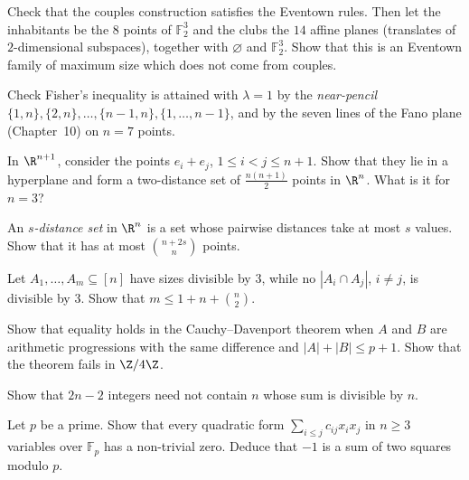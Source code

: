 \begin{exercise}[$\star$]\label{ex:eventown}
Check that the couples construction satisfies the Eventown rules. Then let the inhabitants be the $8$ points of $\mathbb F_2^3$ and the clubs the $14$ affine planes (translates of $2$-dimensional subspaces),
together with $\varnothing$ and $\mathbb F_2^3$. Show that this is an Eventown family of maximum size which does not come from couples.
\end{exercise}

\begin{exercise}[$\star$]\label{ex:nearpencil}
Check Fisher's inequality is attained with $\lambda=1$ by the \emph{near-pencil} $\{1,n\},\{2,n\},\dots,\{n-1,n\},\{1,\dots,n-1\}$, and by the seven lines of the Fano plane (Chapter~10) on $n=7$ points.
\end{exercise}

\begin{exercise}[$\star$]\label{ex:simplexdist}
In $\R^{n+1}$, consider the points $e_i+e_j$, $1\le i<j\le n+1$. Show that they lie in a hyperplane and form a two-distance set of $\frac{n(n+1)}2$ points in $\R^n$. What is it for $n=3$?
\end{exercise}

\begin{exercise}[$\star\star$]\label{ex:sdistance}
An \emph{$s$-distance set} in $\R^n$ is a set whose pairwise distances take at most $s$ values. Show that it has at most $\binom{n+2s}{n}$ points.
\end{exercise}

\begin{exercise}[$\star$]\label{ex:fwmodthree}
Let $A_1,\dots,A_m\subseteq[n]$ have sizes divisible by $3$, while no $|A_i\cap A_j|$, $i\ne j$, is divisible by $3$. Show that $m\le1+n+\binom n2$.
\end{exercise}

\begin{exercise}[$\star$]\label{ex:cdsharp}
Show that equality holds in the Cauchy--Davenport theorem when $A$ and $B$ are arithmetic progressions with the same difference and $|A|+|B|\le p+1$. Show that the theorem fails in $\Z/4\Z$.
\end{exercise}

\begin{exercise}[$\star$]\label{ex:egzsharp}
Show that $2n-2$ integers need not contain $n$ whose sum is divisible by $n$.
\end{exercise}

\begin{exercise}[$\star\star$]\label{ex:quadric}
Let $p$ be a prime. Show that every quadratic form $\sum_{i\le j}c_{ij}x_ix_j$ in $n\ge3$ variables over $\mathbb F_p$ has a non-trivial zero. Deduce that $-1$ is a sum of two squares modulo $p$.
\end{exercise}

